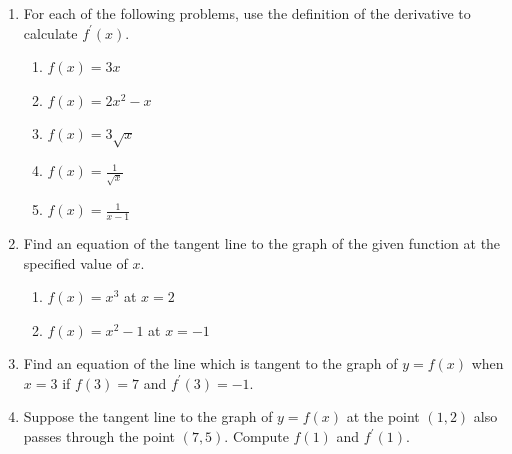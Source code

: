 \documentclass[12pt]{article}
\newif\ifans
\begin{document}
\begin{enumerate}

\item For each of the following problems, use the definition of the derivative to calculate $f^{\prime}(x)$. 

\begin{enumerate}

\item $f(x) = 3x$ 

\ifans{\fbox{3}} \fi

\item $f(x) = 2x^2-x$ 

\ifans{\fbox{$4x-1$}} \fi

\item $f(x) = 3\sqrt{x}$ 

\ifans{\fbox{$\displaystyle \frac{3}{2\sqrt{x}}$}} \fi

\item $\displaystyle f(x)=\frac{1}{\sqrt{x}}$

\ifans{\fbox{$\displaystyle -\frac{1}{2x^{3/2}}$}} \fi

\item $\displaystyle f(x) = \frac{1}{x-1}$ 

\ifans{\fbox{$\displaystyle \frac{-1}{(x-1)^2}$}} \fi

\end{enumerate}

\item Find an equation of the tangent line to the graph of the given function at the specified value of $x$. 

\begin{enumerate}

\item $f(x) = x^3$ at $x=2$ 

\ifans{\fbox{$y=12x-16$}} \fi

\item $f(x) = x^2-1$ at $x=-1$ 

\ifans{\fbox{$y=-2x-2$}} \fi 

\end{enumerate}

\item Find an equation of the line which is tangent to the graph of $y=f(x)$ when $x=3$ if $f(3)=7$ and $f^{\prime}(3)=-1$.

\ifans{\fbox{$y=-x+10$}} \fi

\item Suppose the tangent line to the graph of $y=f(x)$ at the point $(1,2)$ also passes through the point $(7,5)$.  Compute $f(1)$ and $f^{\prime}(1)$.


\end{enumerate}
\end{document}
